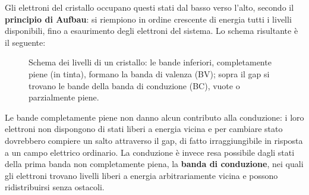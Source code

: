 Gli elettroni del cristallo occupano questi stati dal basso verso l'alto, secondo il \textbf{principio di Aufbau}: si riempiono in ordine crescente di energia tutti i livelli disponibili, fino a esaurimento degli elettroni del sistema. Lo schema risultante è il seguente:

\begin{figure}[H]
    \centering
    \caption{Schema dei livelli di un cristallo: le bande inferiori, completamente piene (in tinta), formano la banda di valenza (BV); sopra il gap si trovano le bande della banda di conduzione (BC), vuote o parzialmente piene.}
    \label{fig:bande_BC_BV}
\end{figure}

Le bande completamente piene non danno alcun contributo alla conduzione: i loro elettroni non dispongono di stati liberi a energia vicina e per cambiare stato dovrebbero compiere un salto attraverso il gap, di fatto irraggiungibile in risposta a un campo elettrico ordinario. La conduzione è invece resa possibile dagli stati della prima banda non completamente piena, la \textbf{banda di conduzione}, nei quali gli elettroni trovano livelli liberi a energia arbitrariamente vicina e possono ridistribuirsi senza ostacoli.

